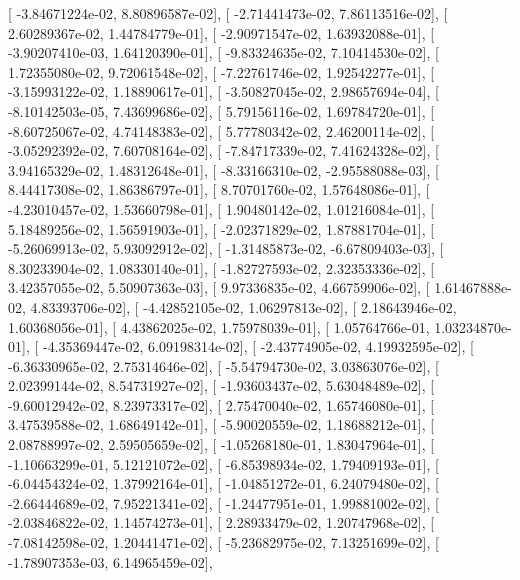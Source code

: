 \documentclass{article}
\begin{document}
       [ -3.84671224e-02,   8.80896587e-02],
       [ -2.71441473e-02,   7.86113516e-02],
       [  2.60289367e-02,   1.44784779e-01],
       [ -2.90971547e-02,   1.63932088e-01],
       [ -3.90207410e-03,   1.64120390e-01],
       [ -9.83324635e-02,   7.10414530e-02],
       [  1.72355080e-02,   9.72061548e-02],
       [ -7.22761746e-02,   1.92542277e-01],
       [ -3.15993122e-02,   1.18890617e-01],
       [ -3.50827045e-02,   2.98657694e-04],
       [ -8.10142503e-05,   7.43699686e-02],
       [  5.79156116e-02,   1.69784720e-01],
       [ -8.60725067e-02,   4.74148383e-02],
       [  5.77780342e-02,   2.46200114e-02],
       [ -3.05292392e-02,   7.60708164e-02],
       [ -7.84717339e-02,   7.41624328e-02],
       [  3.94165329e-02,   1.48312648e-01],
       [ -8.33166310e-02,  -2.95588088e-03],
       [  8.44417308e-02,   1.86386797e-01],
       [  8.70701760e-02,   1.57648086e-01],
       [ -4.23010457e-02,   1.53660798e-01],
       [  1.90480142e-02,   1.01216084e-01],
       [  5.18489256e-02,   1.56591903e-01],
       [ -2.02371829e-02,   1.87881704e-01],
       [ -5.26069913e-02,   5.93092912e-02],
       [ -1.31485873e-02,  -6.67809403e-03],
       [  8.30233904e-02,   1.08330140e-01],
       [ -1.82727593e-02,   2.32353336e-02],
       [  3.42357055e-02,   5.50907363e-03],
       [  9.97336835e-02,   4.66759906e-02],
       [  1.61467888e-02,   4.83393706e-02],
       [ -4.42852105e-02,   1.06297813e-02],
       [  2.18643946e-02,   1.60368056e-01],
       [  4.43862025e-02,   1.75978039e-01],
       [  1.05764766e-01,   1.03234870e-01],
       [ -4.35369447e-02,   6.09198314e-02],
       [ -2.43774905e-02,   4.19932595e-02],
       [ -6.36330965e-02,   2.75314646e-02],
       [ -5.54794730e-02,   3.03863076e-02],
       [  2.02399144e-02,   8.54731927e-02],
       [ -1.93603437e-02,   5.63048489e-02],
       [ -9.60012942e-02,   8.23973317e-02],
       [  2.75470040e-02,   1.65746080e-01],
       [  3.47539588e-02,   1.68649142e-01],
       [ -5.90020559e-02,   1.18688212e-01],
       [  2.08788997e-02,   2.59505659e-02],
       [ -1.05268180e-01,   1.83047964e-01],
       [ -1.10663299e-01,   5.12121072e-02],
       [ -6.85398934e-02,   1.79409193e-01],
       [ -6.04454324e-02,   1.37992164e-01],
       [ -1.04851272e-01,   6.24079480e-02],
       [ -2.66444689e-02,   7.95221341e-02],
       [ -1.24477951e-01,   1.99881002e-02],
       [ -2.03846822e-02,   1.14574273e-01],
       [  2.28933479e-02,   1.20747968e-02],
       [ -7.08142598e-02,   1.20441471e-02],
       [ -5.23682975e-02,   7.13251699e-02],
       [ -1.78907353e-03,   6.14965459e-02],
\end{document}
